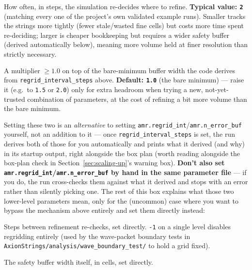 \documentclass[11pt]{article}
\begin{document}
\begin{description}[style=nextline,leftmargin=1.2em,itemsep=0.4em]
\item[\texttt{axion\_strings.tagging.regrid\_interval\_steps}]
  How often, in steps, the simulation re-decides where to refine. \textbf{Typical value: \texttt{2}}
  (matching every one of the project's own validated example runs). Smaller tracks the strings more
  tightly (fewer stale/wasted fine cells) but costs more time spent re-deciding; larger is cheaper
  bookkeeping but requires a wider safety buffer (derived automatically below), meaning more volume held at
  finer resolution than strictly necessary.
\item[\texttt{axion\_strings.tagging.buffer\_safety\_factor}]
  A multiplier $\geq 1.0$ on top of the bare-minimum buffer width the code derives from
  \texttt{regrid\_interval\_steps} above. \textbf{Default: \texttt{1.0}} (the bare minimum) --- raise it
  (e.g.\ to \texttt{1.5} or \texttt{2.0}) only for extra headroom when trying a new, not-yet-trusted
  combination of parameters, at the cost of refining a bit more volume than the bare minimum.
\end{description}

\begin{warn}
Setting these two is an \emph{alternative} to setting \texttt{amr.regrid\_int}/\texttt{amr.n\_error\_buf}
yourself, not an addition to it --- once \texttt{regrid\_interval\_steps} is set, the run derives both of
those for you automatically and prints what it derived (and why) in its startup output, right alongside the
box plan (worth reading alongside the box-plan check in Section~\ref{sec:scaling-up}'s warning box).
\textbf{Don't also set \texttt{amr.regrid\_int}/\texttt{amr.n\_error\_buf} by hand in the same parameter
file} --- if you do, the run cross-checks them against what it derived and stops with an error rather than
silently picking one. The rest of this box explains what those two lower-level parameters mean, only for
the (uncommon) case where you want to bypass the mechanism above entirely and set them directly instead:

\begin{description}[style=nextline,leftmargin=1.2em,itemsep=0.3em]
\item[\texttt{amr.regrid\_int}] Steps between refinement re-checks, set directly. \texttt{-1} on a single
  level disables regridding entirely (used by the wave-packet boundary tests in
  \texttt{AxionStrings/analysis/wave\_boundary\_test/} to hold a grid fixed).
\item[\texttt{amr.n\_error\_buf}] The safety buffer width itself, in cells, set directly.
\end{description}
\end{warn}
\end{document}
